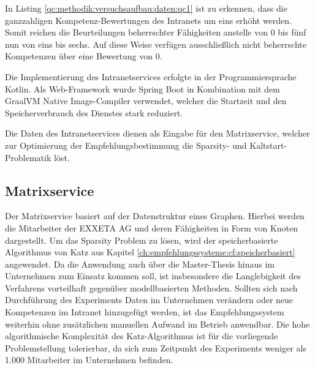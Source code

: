 

In Listing \ref{qc:methodik:versuchsaufbau:daten:qc1} ist zu erkennen, dass die ganzzahligen Kompetenz-Bewertungen des Intranets um eins erhöht werden. Somit reichen die Beurteilungen beherrschter Fähigkeiten anstelle von 0 bis fünf nun von eins bis sechs. Auf diese Weise verfügen ausschließlich nicht beherrschte Kompetenzen über eine Bewertung von 0.

Die Implementierung des Intranetservices erfolgte in der Programmiersprache Kotlin. Als Web-Framework wurde Spring Boot in Kombination mit dem GraalVM Native Image-Compiler verwendet, welcher die Startzeit und den Speicherverbrauch des Dienstes stark reduziert.

Die Daten des Intranetservices dienen als Eingabe für den Matrixservice, welcher zur Optimierung der Empfehlungsbestimmung die Sparsity- und Kaltstart-Problematik löst.

\subsection{Matrixservice}
\label{ch:methodik:versuchsaufbau:systemarchitektur:matrixservice}
Der Matrixservice basiert auf der Datenstruktur eines Graphen. Hierbei werden die Mitarbeiter der EXXETA AG und deren Fähigkeiten in Form von Knoten dargestellt. Um das Sparsity Problem zu lösen, wird der speicherbasierte Algorithmus von Katz aus Kapitel \ref{ch:empfehlungssysteme:cf:speicherbasiert} angewendet. Da die Anwendung auch über die Master-Thesis hinaus im Unternehmen zum Einsatz kommen soll, ist insbesondere die Langlebigkeit des Verfahrens vorteilhaft gegenüber modellbasierten Methoden. Sollten sich nach Durchführung des Experiments Daten im Unternehmen verändern oder neue Kompetenzen im Intranet hinzugefügt werden, ist das Empfehlungssystem weiterhin ohne zusätzlichen manuellen Aufwand im Betrieb anwendbar. Die hohe algorithmische Komplexität des Katz-Algorithmus ist für die vorliegende Problemstellung tolerierbar, da sich zum Zeitpunkt des Experiments weniger als 1.000 Mitarbeiter im Unternehmen befinden.

